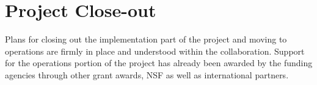 

\section{Project Close-out}

Plans for closing out the implementation part of the project and moving to operations are firmly in place and understood within the collaboration.  Support for the operations portion of the project has already been awarded by the funding agencies through other grant awards, NSF as well as international partners.  





